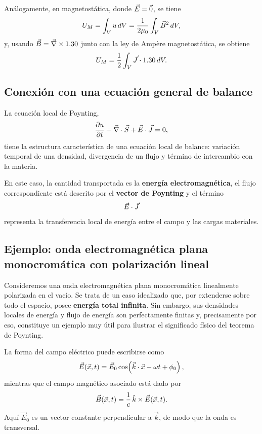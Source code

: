 \documentclass[../main.tex]{subfiles}
\begin{document}
Análogamente, en magnetostática, donde $\vec{E}=\vec 0$, se tiene
\begin{equation*}
    U_M=\int_V u\,dV=\frac{1}{2\mu_0}\int_V \vec{B}^2\,dV,
\end{equation*}
y, usando $\vec{B}=\vec\nabla\times1.30$ junto con la ley de Ampère magnetostática, se obtiene
\begin{equation*}
    U_M=\frac{1}{2}\int_V \vec{J}\cdot1.30\,dV.
\end{equation*}

\subsection*{Conexión con una ecuación general de balance}

La ecuación local de Poynting,
\begin{equation*}
    \frac{\partial u}{\partial t}
    +
    \vec\nabla\cdot\vec S
    +
    \vec{E}\cdot\vec{J}
    =0,
\end{equation*}
tiene la estructura característica de una ecuación local de balance: variación temporal de una densidad, divergencia de un flujo y término de intercambio con la materia.

En este caso, la cantidad transportada es la \textbf{energía electromagnética}, el flujo correspondiente está descrito por el \textbf{vector de Poynting} y el término
\begin{equation*}
    \vec{E}\cdot\vec{J}
\end{equation*}
representa la transferencia local de energía entre el campo y las cargas materiales.


\subsection{Ejemplo: onda electromagnética plana monocromática con polarización lineal}

Consideremos una onda electromagnética plana monocromática linealmente polarizada en el vacío. Se trata de un caso idealizado que, por extenderse sobre todo el espacio, posee \textbf{energía total infinita}. Sin embargo, sus densidades locales de energía y flujo de energía son perfectamente finitas y, precisamente por eso, constituye un ejemplo muy útil para ilustrar el significado físico del teorema de Poynting.

La forma del campo eléctrico puede escribirse como
\begin{equation}
    \vec{E}(\vec x,t)=\vec E_0\cos\!\left(\vec k\cdot\vec x-\omega t+\phi_0\right),
    \label{eq:onda-plana-E}
\end{equation}
mientras que el campo magnético asociado está dado por
\begin{equation}
    \vec{B}(\vec x,t)=\frac{1}{c}\,\hat k\times \vec{E}(\vec x,t).
    \label{eq:onda-plana-B}
\end{equation}
Aquí \(\vec E_0\) es un vector constante perpendicular a \(\vec k\), de modo que la onda es transversal.
\end{document}
